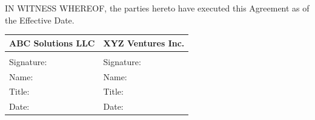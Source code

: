 \vspace{1cm}

\noindent IN WITNESS WHEREOF, the parties hereto have executed this Agreement as of the Effective Date.

\vspace{1cm}


\tabcolsep=0pt
\tabulinesep=19pt
\begin{tabu}{XX}
	\textbf{ABC Solutions LLC} & \textbf{XYZ Ventures Inc.} \\
	\hline
    {} & {} \\
	Signature:                 & Signature:                 \\
	Name:                      & Name:                      \\
	Title:                     & Title:                     \\
	Date:                      & Date:                      \\
\end{tabu}





